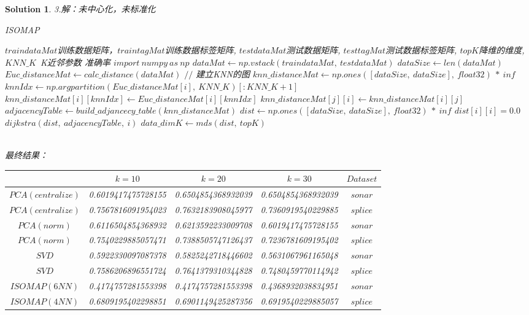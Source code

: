 \documentclass[a4paper,UTF8]{article}
\numberwithin{equation}{section}
\newtheorem*{solution}{Solution}
\begin{document}
\begin{solution}
\newpage
\noindent
3.解：未中心化，未标准化
\begin{algorithm}
	\caption{ISOMAP}
	\begin{algorithmic}[1]
		\Require $traindataMat$训练数据矩阵，$traintagMat$训练数据标签矩阵, $testdataMat$测试数据矩阵, $testtagMat$测试数据标签矩阵, $topK$降维的维度, $KNN\_K$\ K近邻参数
		\Ensure 准确率
		\State $import\ numpy\ as\ np$
		\State $dataMat \gets np.vstack(traindataMat,\ testdataMat)$
		\State $dataSize \gets len(dataMat)$
		\State $Euc\_distanceMat \gets calc\_distance(dataMat)$
		\State $//$ 建立KNN的图
		\State $knn\_distanceMat \gets np.ones([dataSize,\ dataSize],\ float32)\ *\ inf$
			\State $knnIdx \gets np.argpartition(Euc\_distanceMat[i],\ KNN\_K)[:KNN\_K + 1]$
			\State $knn\_distanceMat[i][knnIdx] \gets Euc\_distanceMat[i][knnIdx]$
				\State $knn\_distanceMat[j][i] \gets knn\_distanceMat[i][j]$
			\EndFor
		\EndFor
		\State $adjacencyTable \gets build\_adjancecy\_table(knn\_distanceMat)$
		\State $dist \gets np.ones([dataSize,\ dataSize],\ float32)\ *\ inf$
			\State $dist[i][i] = 0.0$
			\State $dijkstra(dist,\ adjacencyTable,\ i)$
		\EndFor
		\State $data\_dimK \gets mds(dist,\ topK)$
		\State {}
	\end{algorithmic}
\end{algorithm}\\

\newpage
\noindent
最终结果：
\begin{table}[!htbp] 
	\centering \begin{tabular}{|c|c|c|c|c|} 
	\hline 
	\diagbox{$Method$}{$Accuracy$}{$Dim$}&$k=10$&$k=20$&$k=30$&$Dataset$\\
	\hline $PCA(centralize)$&0.6019417475728155&0.6504854368932039&0.6504854368932039&$sonar$\\ 
	\hline $PCA(centralize)$&0.7567816091954023&0.7632183908045977&0.7360919540229885&$splice$\\ 
	\hline $PCA(norm)$&0.6116504854368932&0.6213592233009708&0.6019417475728155&$sonar$\\ 
	\hline $PCA(norm)$&0.7540229885057471&0.7388505747126437&0.7236781609195402&$splice$\\ 
	\hline $SVD$&0.5922330097087378&0.5825242718446602&0.5631067961165048&$sonar$\\ 
	\hline $SVD$&0.7586206896551724&0.7641379310344828&0.7480459770114942&$splice$\\ 
	\hline $ISOMAP(6NN)$&0.4174757281553398&0.4174757281553398&0.4368932038834951&$sonar$\\ 
	\hline $ISOMAP(4NN)$&0.6809195402298851&0.6901149425287356&0.6919540229885057&$splice$\\ 
	\hline 
	\end{tabular} 
\end{table}
\end{solution}
\newpage 
\end{document}
